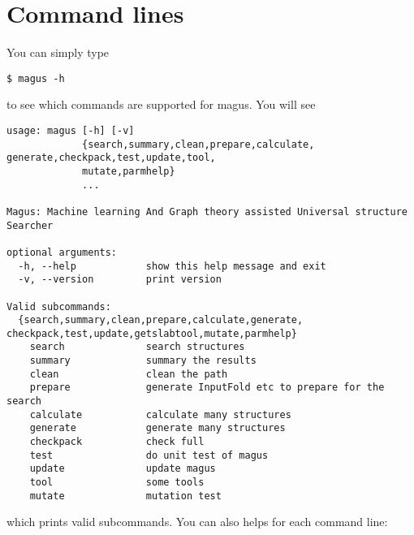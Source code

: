 \documentclass[12pt,oneside]{book}
\begin{document}
\section{Command lines}
You can simply type
\begin{tcolorbox}
    \begin{verbatim}
$ magus -h
    \end{verbatim}
\end{tcolorbox}
to see which commands are supported for magus. You will see
\begin{tcolorbox}
    \begin{verbatim}
usage: magus [-h] [-v]
             {search,summary,clean,prepare,calculate, generate,checkpack,test,update,tool,
             mutate,parmhelp}
             ...

Magus: Machine learning And Graph theory assisted Universal structure Searcher

optional arguments:
  -h, --help            show this help message and exit
  -v, --version         print version

Valid subcommands:
  {search,summary,clean,prepare,calculate,generate, checkpack,test,update,getslabtool,mutate,parmhelp}
    search              search structures
    summary             summary the results
    clean               clean the path
    prepare             generate InputFold etc to prepare for the search
    calculate           calculate many structures
    generate            generate many structures
    checkpack           check full
    test                do unit test of magus
    update              update magus
    tool                some tools 
    mutate              mutation test
    \end{verbatim}
\end{tcolorbox}
which prints valid subcommands. You can also helps for each command line:
\end{document}
